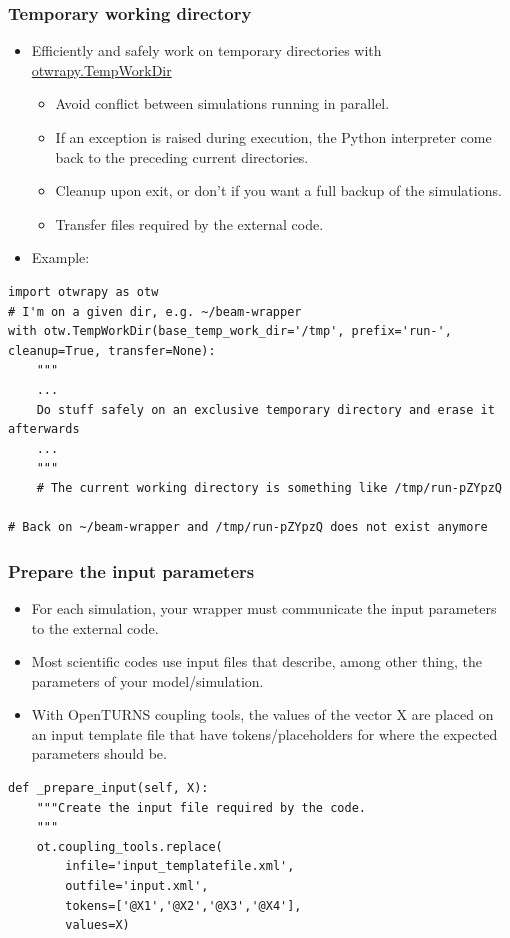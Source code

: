 \documentclass[10pt, aspectratio=169]{beamer}
\begin{document}
\begin{frame}[fragile]
\frametitle{Temporary working directory}
\begin{itemize}
\item Efficiently and safely work on temporary directories with \href{http://openturns.github.io/otwrapy/master/_generated/otwrapy.TempWorkDir.html}{otwrapy.TempWorkDir}
\begin{itemize}
\item Avoid conflict between simulations running in parallel.
\item If an exception is raised during execution, the Python interpreter
    come back to the preceding current directories.
\item Cleanup upon exit, or don't if you want a full backup of the simulations.
\item Transfer files required by the external code.
\end{itemize}
\item Example:
\end{itemize}

\begin{Verbatim}[xleftmargin=10mm]
import otwrapy as otw
# I'm on a given dir, e.g. ~/beam-wrapper
with otw.TempWorkDir(base_temp_work_dir='/tmp', prefix='run-', cleanup=True, transfer=None):
    """
    ...
    Do stuff safely on an exclusive temporary directory and erase it afterwards
    ...
    """
    # The current working directory is something like /tmp/run-pZYpzQ

# Back on ~/beam-wrapper and /tmp/run-pZYpzQ does not exist anymore
\end{Verbatim}

\end{frame}


\begin{frame}[fragile]
\frametitle{Prepare the input parameters}
\begin{itemize}
\item For each simulation, your wrapper must communicate the input parameters to the external code.
\item Most scientific codes use input files that describe, among other thing, the parameters of your model/simulation.
\item With OpenTURNS coupling tools, the values of the vector X are placed on an input template file that have tokens/placeholders for where the expected parameters should be.
\end{itemize}
\begin{Verbatim}[xleftmargin=10mm]
def _prepare_input(self, X):
    """Create the input file required by the code.
    """
    ot.coupling_tools.replace(
        infile='input_templatefile.xml',
        outfile='input.xml',
        tokens=['@X1','@X2','@X3','@X4'],
        values=X)
\end{Verbatim}
\end{frame}
\end{document}
